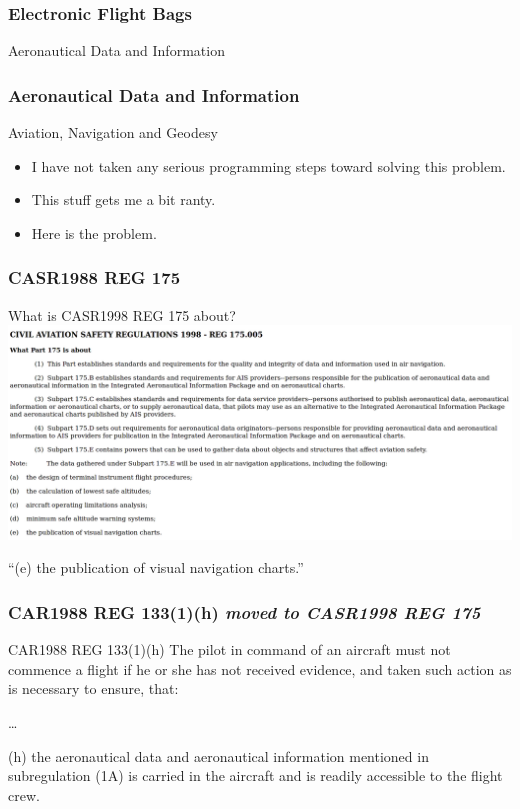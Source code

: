 \begin{frame}
\frametitle{Electronic Flight Bags}
\begin{center}
Aeronautical Data and Information
\end{center}
\end{frame}

\begin{frame}
\frametitle{Aeronautical Data and Information}
\begin{block}{Aviation, Navigation and Geodesy}
\begin{itemize}
\item<1-> I have not taken any serious programming steps toward solving this problem.
\item<2-> This stuff gets me a bit ranty.
\item<3-> Here is the problem.
\end{itemize}
\end{block}
\end{frame}

\begin{frame}
\frametitle{CASR1988 REG 175}
\begin{block}{What is CASR1998 REG 175 about?}
\includegraphics[height=0.5\textheight]{image/casr175_005.png}
\end{block}
\par
``(e) the publication of visual navigation charts.''
\end{frame}

\begin{frame}
\frametitle{CAR1988 REG 133(1)(h) \emph{moved to CASR1998 REG 175}}
\scriptsize
\begin{block}{CAR1988 REG 133(1)(h)}
The pilot in command of an aircraft must not commence a flight if he or she has not received evidence, and taken such action as is necessary to ensure, that:
\par
\ldots
\par
(h)  the aeronautical data and aeronautical information mentioned in subregulation (1A) is carried in the aircraft and is readily accessible to the flight crew.
\end{block}
\par
\end{frame}

